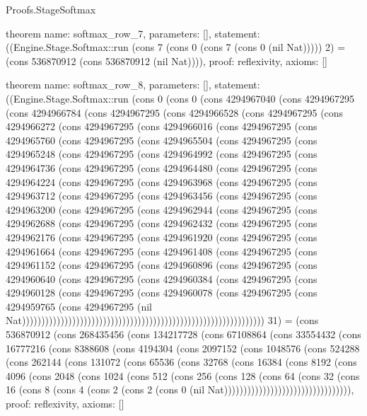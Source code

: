 \begin{lexlean}{Proofs.StageSoftmax}
\begin{semanticmodule}
theorem{
  name: softmax_row_7,
  parameters: [],
  statement: ((Engine.Stage.Softmax::run (cons 7 (cons 0 (cons 7 (cons 0 (nil Nat))))) 2) = (cons 536870912 (cons 536870912 (nil Nat)))),
  proof: reflexivity{},
  axioms: []
}

theorem{
  name: softmax_row_8,
  parameters: [],
  statement: ((Engine.Stage.Softmax::run (cons 0 (cons 0 (cons 4294967040 (cons 4294967295 (cons 4294966784 (cons 4294967295 (cons 4294966528 (cons 4294967295 (cons 4294966272 (cons 4294967295 (cons 4294966016 (cons 4294967295 (cons 4294965760 (cons 4294967295 (cons 4294965504 (cons 4294967295 (cons 4294965248 (cons 4294967295 (cons 4294964992 (cons 4294967295 (cons 4294964736 (cons 4294967295 (cons 4294964480 (cons 4294967295 (cons 4294964224 (cons 4294967295 (cons 4294963968 (cons 4294967295 (cons 4294963712 (cons 4294967295 (cons 4294963456 (cons 4294967295 (cons 4294963200 (cons 4294967295 (cons 4294962944 (cons 4294967295 (cons 4294962688 (cons 4294967295 (cons 4294962432 (cons 4294967295 (cons 4294962176 (cons 4294967295 (cons 4294961920 (cons 4294967295 (cons 4294961664 (cons 4294967295 (cons 4294961408 (cons 4294967295 (cons 4294961152 (cons 4294967295 (cons 4294960896 (cons 4294967295 (cons 4294960640 (cons 4294967295 (cons 4294960384 (cons 4294967295 (cons 4294960128 (cons 4294967295 (cons 4294960078 (cons 4294967295 (cons 4294959765 (cons 4294967295 (nil Nat))))))))))))))))))))))))))))))))))))))))))))))))))))))))))))))) 31) = (cons 536870912 (cons 268435456 (cons 134217728 (cons 67108864 (cons 33554432 (cons 16777216 (cons 8388608 (cons 4194304 (cons 2097152 (cons 1048576 (cons 524288 (cons 262144 (cons 131072 (cons 65536 (cons 32768 (cons 16384 (cons 8192 (cons 4096 (cons 2048 (cons 1024 (cons 512 (cons 256 (cons 128 (cons 64 (cons 32 (cons 16 (cons 8 (cons 4 (cons 2 (cons 2 (cons 0 (nil Nat))))))))))))))))))))))))))))))))),
  proof: reflexivity{},
  axioms: []
}
\end{semanticmodule}
\end{lexlean}
